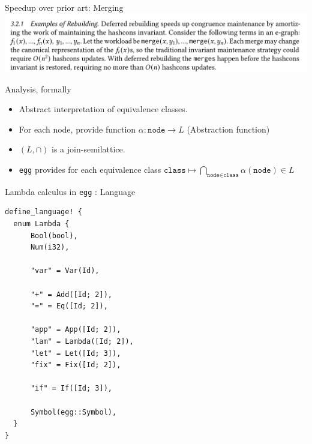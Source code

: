 \documentclass[8pt]{beamer}
\newcommand{\node}{\texttt{node}}
\newcommand{\class}{\texttt{class}}
\newcommand{\egg}{\texttt{egg} }
\begin{document}
\begin{frame}[fragile]{Speedup over prior art: Merging}
\includegraphics[width=\textwidth]{./eg-2-paper-snippet.png}
\end{frame}

\begin{frame}[fragile]{Analysis, formally}
\begin{itemize}
\item Abstract interpretation of equivalence classes.
\item For each node, provide function $\alpha: \node \rightarrow L$ (Abstraction function)
\item $(L, \cap)$ is a join-semilattice.
\item \egg provides for each equivalence class $\class \mapsto \bigcap_{\node \in \class} \alpha(\node) \in L$
\end{itemize}
\end{frame}


\begin{frame}[fragile]{Lambda calculus in \egg: Language}
\begin{verbatim}
define_language! {
  enum Lambda {
      Bool(bool),
      Num(i32),

      "var" = Var(Id),

      "+" = Add([Id; 2]),
      "=" = Eq([Id; 2]),

      "app" = App([Id; 2]),
      "lam" = Lambda([Id; 2]),
      "let" = Let([Id; 3]),
      "fix" = Fix([Id; 2]),

      "if" = If([Id; 3]),

      Symbol(egg::Symbol),
  }
}
\end{verbatim}

\end{frame}
\end{document}
